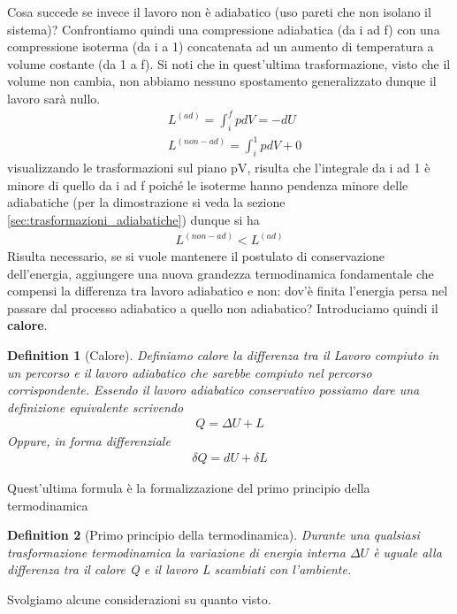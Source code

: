 \documentclass[10pt,a4paper]{article}
\newtheorem{definition}{Definition}
\begin{document}
Cosa succede se invece il lavoro non è adiabatico (uso pareti che non isolano il sistema)? Confrontiamo quindi una compressione adiabatica (da i ad f) con una compressione isoterma (da i a 1) concatenata ad un aumento di temperatura a volume costante (da 1 a f). Si noti che in quest'ultima trasformazione, visto che il volume non cambia, non abbiamo nessuno spostamento generalizzato dunque il lavoro sarà nullo. 
\begin{align*} 
&L^{(ad)} = \int_{i}^{f} p dV = -dU\\
&L^{(non-ad)} = \int_{i}^{1}pdV+0
\end{align*} 
visualizzando le trasformazioni sul piano pV, risulta che l'integrale da i ad 1 è minore di quello da i ad f poiché le isoterme hanno pendenza minore delle adiabatiche (per la dimostrazione si veda la sezione \ref{sec:trasformazioni_adiabatiche}) dunque si ha
\begin{align*} 
	L^{(non-ad)}<L^{(ad)}
\end{align*} 
Risulta necessario, se si vuole mantenere il postulato di conservazione dell'energia, aggiungere una nuova grandezza termodinamica fondamentale che compensi la differenza tra lavoro adiabatico e non: dov'è finita l'energia persa nel passare dal processo adiabatico a quello non adiabatico? Introduciamo quindi il \textbf{calore}.
\begin{definition}[Calore]
	Definiamo calore la differenza tra il Lavoro compiuto in un percorso e il lavoro adiabatico che sarebbe compiuto nel percorso corrispondente. Essendo il lavoro adiabatico conservativo possiamo dare una definizione equivalente scrivendo
	\begin{align*} 
		Q = \Delta U + L
	\end{align*} 
	Oppure, in forma differenziale
		\begin{align*}
		\delta Q = d U + \delta L
	\end{align*} 
\end{definition}
Quest'ultima formula è la formalizzazione del primo principio della termodinamica
\begin{definition}[Primo principio della termodinamica]
	Durante una qualsiasi trasformazione termodinamica la variazione di energia interna $\Delta U$ è uguale alla differenza tra il calore Q e il lavoro L scambiati con l'ambiente. 
\end{definition}
Svolgiamo alcune considerazioni su quanto visto.
\end{document}
